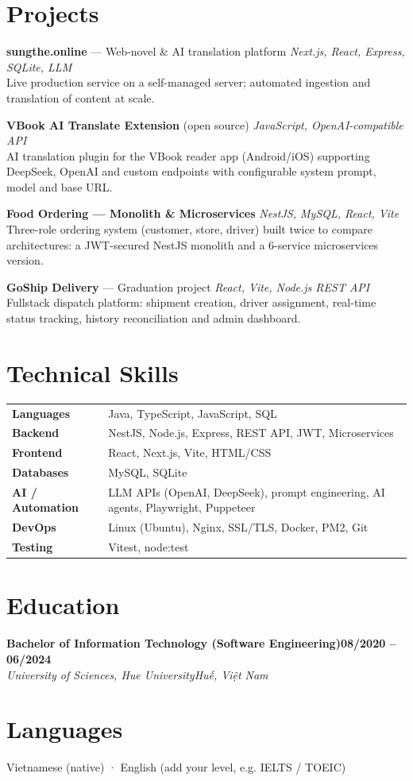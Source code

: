 \documentclass[10pt,a4paper]{article}
\newcommand{\entry}[4]{\textbf{#1}\hfill\textbf{#2}\\ \textit{#3}\hfill\textit{#4}\par\vspace{1pt}}
\begin{document}
\section{Projects}
\textbf{sungthe.online} --- Web-novel \& AI translation platform \hfill \textit{Next.js, React, Express, SQLite, LLM}\\
Live production service on a self-managed server; automated ingestion and translation of content at scale.\par\vspace{3pt}
\textbf{VBook AI Translate Extension} (open source) \hfill \textit{JavaScript, OpenAI-compatible API}\\
AI translation plugin for the VBook reader app (Android/iOS) supporting DeepSeek, OpenAI and custom endpoints with configurable system prompt, model and base URL.\par\vspace{3pt}
\textbf{Food Ordering --- Monolith \& Microservices} \hfill \textit{NestJS, MySQL, React, Vite}\\
Three-role ordering system (customer, store, driver) built twice to compare architectures: a JWT-secured NestJS monolith and a 6-service microservices version.\par\vspace{3pt}
\textbf{GoShip Delivery} --- Graduation project \hfill \textit{React, Vite, Node.js REST API}\\
Fullstack dispatch platform: shipment creation, driver assignment, real-time status tracking, history reconciliation and admin dashboard.

\section{Technical Skills}
\begin{tabular}{@{}p{3.1cm}p{13.2cm}@{}}
\textbf{Languages} & Java, TypeScript, JavaScript, SQL\\
\textbf{Backend} & NestJS, Node.js, Express, REST API, JWT, Microservices\\
\textbf{Frontend} & React, Next.js, Vite, HTML/CSS\\
\textbf{Databases} & MySQL, SQLite\\
\textbf{AI / Automation} & LLM APIs (OpenAI, DeepSeek), prompt engineering, AI agents, Playwright, Puppeteer\\
\textbf{DevOps} & Linux (Ubuntu), Nginx, SSL/TLS, Docker, PM2, Git\\
\textbf{Testing} & Vitest, node:test\\
\end{tabular}

\section{Education}
\entry{Bachelor of Information Technology (Software Engineering)}{08/2020 -- 06/2024}{University of Sciences, Hue University}{Huế, Việt Nam}

\section{Languages}
Vietnamese (native) \;·\; English (add your level, e.g. IELTS / TOEIC)
\end{document}
